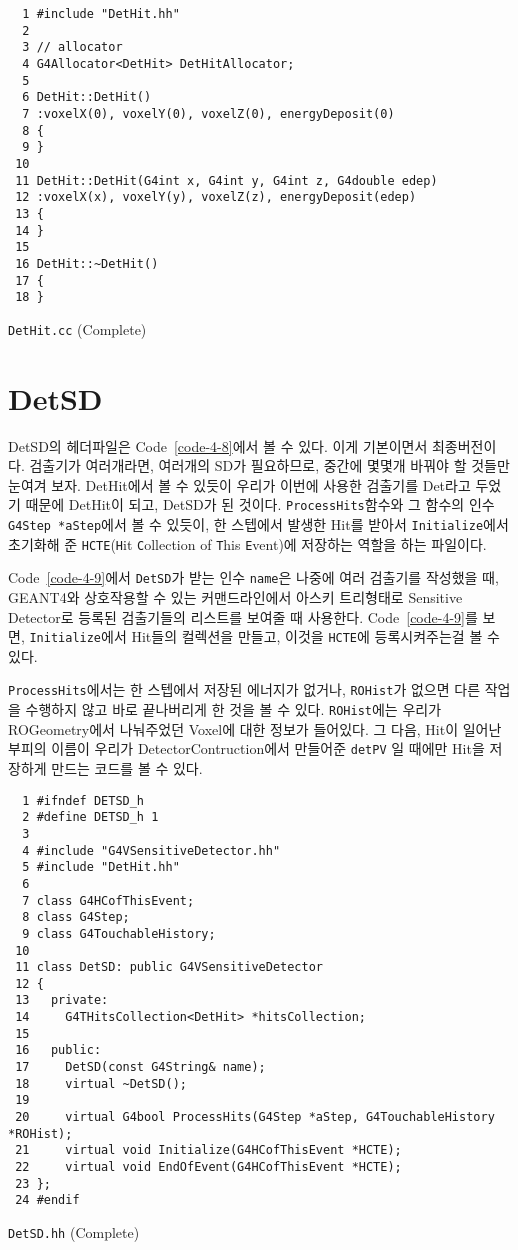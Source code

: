 \begin{code}[p]
\begin{lstlisting}
  1 #include "DetHit.hh"
  2 
  3 // allocator
  4 G4Allocator<DetHit> DetHitAllocator;
  5 
  6 DetHit::DetHit()
  7 :voxelX(0), voxelY(0), voxelZ(0), energyDeposit(0)
  8 {
  9 }
 10 
 11 DetHit::DetHit(G4int x, G4int y, G4int z, G4double edep)
 12 :voxelX(x), voxelY(y), voxelZ(z), energyDeposit(edep)
 13 {
 14 }
 15 
 16 DetHit::~DetHit()
 17 {
 18 }
\end{lstlisting}
\caption{\texttt{DetHit.cc} (Complete) \label{code-4-7}}
\end{code}

\section{DetSD}
DetSD의 헤더파일은 Code~\ref{code-4-8}에서 볼 수 있다. 이게 기본이면서
최종버전이다. 검출기가 여러개라면, 여러개의 SD가 필요하므로, 중간에 몇몇개
바꿔야 할 것들만 눈여겨 보자. DetHit에서 볼 수 있듯이 우리가 이번에 사용한
검출기를 Det라고 두었기 때문에 DetHit이 되고, DetSD가 된 것이다.
\texttt{ProcessHits}함수와 그 함수의 인수 \texttt{G4Step *aStep}에서 볼 수
있듯이, 한 스텝에서 발생한 Hit를 받아서 \texttt{Initialize}에서 초기화해 준
\texttt{HCTE}(\texttt{H}it \texttt{C}ollection of \texttt{T}his
\texttt{E}vent)에 저장하는 역할을 하는 파일이다.

Code~\ref{code-4-9}에서 \texttt{DetSD}가 받는 인수 \texttt{name}은 나중에 여러
검출기를 작성했을 때, GEANT4와 상호작용할 수 있는 커맨드라인에서 아스키
트리형태로 Sensitive Detector로 등록된 검출기들의 리스트를 보여줄 때
사용한다. Code~\ref{code-4-9}를 보면, \texttt{Initialize}에서 Hit들의 컬렉션을
만들고, 이것을 \texttt{HCTE}에 등록시켜주는걸 볼 수 있다.

\texttt{ProcessHits}에서는 한 스텝에서 저장된 에너지가 없거나,
\texttt{ROHist}가 없으면 다른 작업을 수행하지 않고 바로 끝나버리게 한 것을 볼
수 있다. \texttt{ROHist}에는 우리가 ROGeometry에서 나눠주었던 Voxel에 대한
정보가 들어있다. 그 다음, Hit이 일어난 부피의 이름이 우리가
DetectorContruction에서 만들어준 \texttt{detPV} 일 때에만 Hit을 저장하게 만드는
코드를 볼 수 있다.

\begin{code}[p]
\begin{lstlisting}
  1 #ifndef DETSD_h
  2 #define DETSD_h 1
  3 
  4 #include "G4VSensitiveDetector.hh"
  5 #include "DetHit.hh"
  6 
  7 class G4HCofThisEvent;
  8 class G4Step;
  9 class G4TouchableHistory;
 10 
 11 class DetSD: public G4VSensitiveDetector
 12 {
 13   private:
 14     G4THitsCollection<DetHit> *hitsCollection;
 15 
 16   public:
 17     DetSD(const G4String& name);
 18     virtual ~DetSD();
 19 
 20     virtual G4bool ProcessHits(G4Step *aStep, G4TouchableHistory *ROHist);
 21     virtual void Initialize(G4HCofThisEvent *HCTE);
 22     virtual void EndOfEvent(G4HCofThisEvent *HCTE);
 23 };
 24 #endif
\end{lstlisting}
\caption{\texttt{DetSD.hh} (Complete) \label{code-4-8}}
\end{code}

